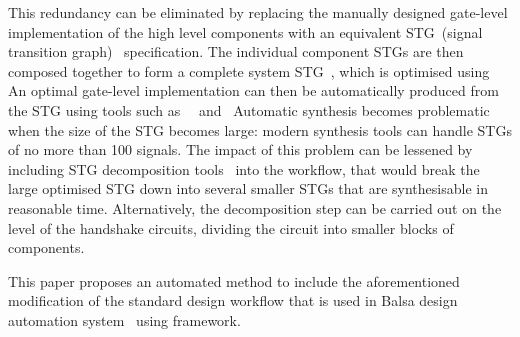 This redundancy can be eliminated by replacing the manually designed
gate-level implementation of the high level components with an equivalent
STG~(signal transition graph)~\cite{Yakovlev_1998_cs} specification.
The individual component STGs are then composed together to form a
complete system STG~\cite{785214}, which is optimised using \cite{cortadella_petrify}
An optimal gate-level implementation can then be automatically produced
from the STG using tools such as ~~\cite{Sentovich:M92/41}\noun{ }and~\cite{Khomenko_2004_MPSAT}
Automatic synthesis becomes problematic when the size of the STG becomes
large: modern synthesis tools can handle STGs of no more than 100
signals. The impact of this problem can be lessened by including STG
decomposition tools~\cite{DesiJ} into the workflow, that would break
the large optimised STG down into several smaller STGs that are synthesisable
in reasonable time. Alternatively, the decomposition step can be carried
out on the level of the handshake circuits, dividing the circuit into
smaller blocks of components.

This paper proposes an automated method to include the aforementioned
modification of the standard design workflow that is used in Balsa
design automation system~\cite{balsa} using framework.
